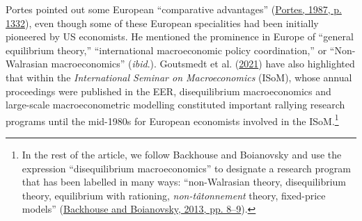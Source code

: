 \documentclass[
  12pt,
  onecolumn]{article}
\begin{document}
Portes pointed out some European ``comparative advantages'' (\protect\hyperlink{ref-portes1987}{Portes, 1987, p. 1332}), even though some of these European specialities had been initially pioneered by US economists. He mentioned the prominence in Europe of ``general equilibrium theory,'' ``international macroeconomic policy coordination,'' or ``Non-Walrasian macroeconomics'' (\emph{ibid}.). Goutsmedt et al. (\protect\hyperlink{ref-goutsmedt2021}{2021}) have also highlighted that within the \emph{International Seminar on Macroeconomics} (ISoM), whose annual proceedings were published in the EER, disequilibrium macroeconomics and large-scale macroeconometric modelling constituted important rallying research programs until the mid-1980s for European economists involved in the ISoM.\footnote{In the rest of the article, we follow Backhouse and Boianovsky and use the expression ``disequilibrium macroeconomics'' to designate a research program that has been labelled in many ways: ``non-Walrasian theory, disequilibrium theory, equilibrium with rationing, \emph{non-tâtonnement} theory, fixed-price models'' (\protect\hyperlink{ref-backhouseboianovski2013}{Backhouse and Boianovsky, 2013, pp. 8--9}).}
\end{document}
